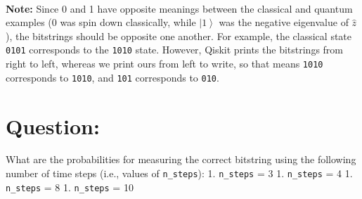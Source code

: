 \documentclass[11pt]{article}
\providecommand{\ket}[1]{\left|#1\right\rangle}
\begin{document}
    \begin{center}
    \end{center}
    { \hspace*{\fill} \\}
    
    \textbf{Note:} Since 0 and 1 have opposite meanings between the
classical and quantum examples (0 was spin down classically, while
\(\ket{1}\) was the negative eigenvalue of \(\hat{z}\)), the bitstrings
should be opposite one another. For example, the classical state
\texttt{0101} corresponds to the \texttt{1010} state. However, Qiskit
prints the bitstrings from right to left, whereas we print ours from
left to write, so that means \texttt{1010} corresponds to \texttt{1010},
and \texttt{101} corresponds to \texttt{010}.

    \section{\texorpdfstring{\textbf{Question}:}{Question:}}\label{question}

What are the probabilities for measuring the correct bitstring using the
following number of time steps (i.e., values of \texttt{n\_steps}): 1.
\texttt{n\_steps} = 3 1. \texttt{n\_steps} = 4 1. \texttt{n\_steps} = 8
1. \texttt{n\_steps} = 10
\end{document}
